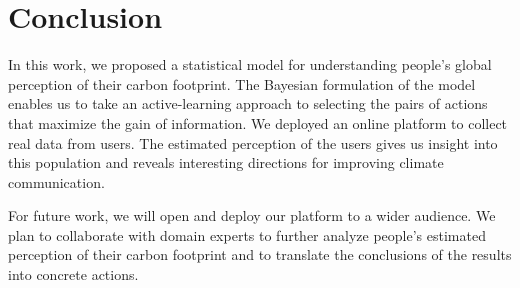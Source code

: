\section{Conclusion}
\label{clm:sec:conclusion}

In this work, we proposed a statistical model for understanding people's global perception of their carbon footprint.
The Bayesian formulation of the model enables us to take an active-learning approach to selecting the pairs of actions that maximize the gain of information.
We deployed an online platform to collect real data from users.
The estimated perception of the users gives us insight into this population and reveals interesting directions for improving climate communication.

For future work, we will open and deploy our platform to a wider audience.
We plan to collaborate with domain experts to further analyze people's estimated perception of their carbon footprint and to translate the conclusions of the results into concrete actions.
